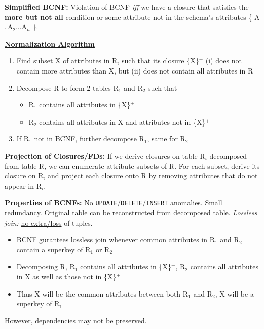\documentclass[10pt,landscape]{article}
\begin{document}
\begin{multicols*}{3}
\textbf{Simplified BCNF:} Violation of BCNF \textit{iff} we have a closure that satisfies the \textbf{more but not all} condition or some attribute not in the schema's attributes \{ A$_1$A$_2$...A$_n$ \}.

\textbf{\underline{Normalization Algorithm}}
\begin{enumerate}[topsep=0pt,noitemsep,wide=0pt, leftmargin=\dimexpr\labelwidth + 2\labelsep\relax]
    \item Find subset X of attributes in R, such that its closure \{X\}$^+$ (i) does not
    contain more attributes than X, but (ii) does not contain all attributes in R
    \item Decompose R to form 2 tables R$_1$ and R$_2$ such that 
    \begin{itemize}[topsep=0pt,noitemsep,wide=0pt, leftmargin=\dimexpr{} + 2\relax]
        \item R$_1$ contains all attributes in \{X\}$^+$
        \item R$_2$ contains all attributes in X and attributes not in \{X\}$^+$
    \end{itemize}
    \item If R$_1$ not in BCNF, further decompose R$_1$, same for R$_2$
\end{enumerate}


\textbf{Projection of Closures/FDs:}
If we derive closures on table R$_i$ decomposed from table R, we can enumerate attribute subsets of R. For each subset, derive
its closure on R, and project each closure onto R by removing attributes that do not appear in R$_i$.

\textbf{Properties of BCNFs:}
No \verb|UPDATE|/\verb|DELETE|/\verb|INSERT| anomalies. Small redundancy. Original table can be reconstructed from decomposed table. \textit{Lossless join:} \underline{no extra/loss} of tuples.
\begin{itemize}[topsep=0pt,noitemsep,wide=0pt, leftmargin=\dimexpr{} + 2\relax]
    \item BCNF gurantees lossless join whenever common attributes in R$_1$ and R$_2$ contain a superkey of R$_1$ or R$_2$
    \item Decomposing R, R$_1$ contains all attributes in \{X\}$^+$, R$_2$ contains all attributes in X as well as those not in \{X\}$^+$
    \item Thus X will be the common attributes between both R$_1$ and R$_2$, X will be a superkey of R$_1$
\end{itemize}
However, dependencies may not be preserved.


\end{multicols*}
\end{document}
